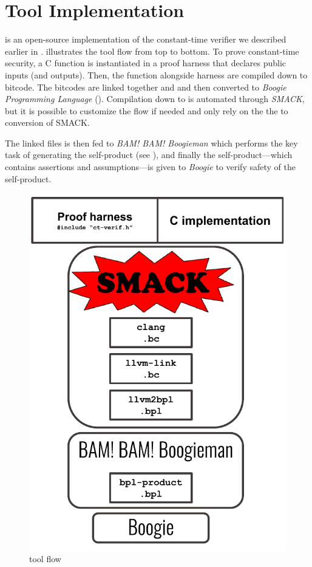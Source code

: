 \section{Tool Implementation}

\ctVerif is an open-source implementation of the constant-time verifier we
described earlier in .  illustrates the
tool flow from top to bottom. To prove constant-time security, a C function is
instantiated in a proof harness that declares public inputs (and outputs). Then,
the function alongside harness are compiled down to  bitcode. The
bitcodes are linked together and and then converted to \emph{Boogie Programming
Language} (). Compilation down to  is automated
through \emph{SMACK}\cite{smack}, but it is possible to customize the flow if
needed and only rely on the the  to  conversion
of SMACK.

The linked  files is then fed to \emph{BAM! BAM! Boogieman} which
performs the key task of generating the self-product (see ), and
finally the self-product---which contains assertions and assumptions---is
given to \emph{Boogie}\cite{boogie} to verify safety of the self-product.


\begin{figure}[h]
    \centering
    \includegraphics[width=\textwidth]{figs/ct-verif-flow.pdf}
    \caption{\ctVerif tool flow}
    \label{fig:ct-verif-flow}
\end{figure}